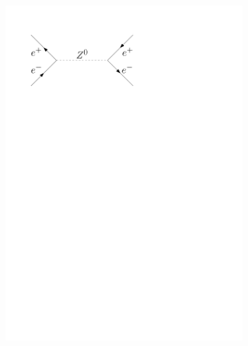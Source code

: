 \documentclass[11pt, a4paper]{article}
\numberwithin{equation}{section}
\begin{document}
\begin{figure}[htb]
	\centering
	\begin{subfigure}{.32\textwidth}
		\centering
		\includegraphics[width=.9\textwidth]{./figures/theory/feynman/ee_s}
	\end{subfigure}
	\begin{subfigure}{.32\textwidth}
		\centering

\end{subfigure}
\end{figure}
\end{document}
